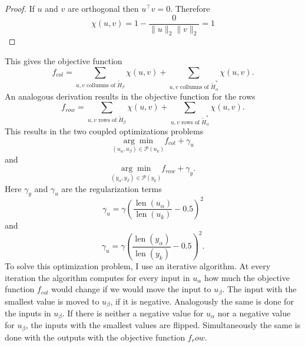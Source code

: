 \documentclass[doctype=mastersthesis,BCOR=15mm,biblatex]{ldvbook}%
\DeclareMathOperator{\length}{len}
\newcommand{\partition}{\mathcal{P}}
\begin{document}
\begin{proof}
	If $u$ and $v$ are orthogonal then $u^\top v =0$. Therefore
	\begin{equation}
	\chi(u,v) = 1-\frac{0}{\|u\|_2\|v\|_2}= 1
	\end{equation}
\end{proof}
This gives the objective function
\begin{equation}
	f_{col} = \sum_{u,v \text{ collumns of }  \tilde{H}_\beta}\!\!\!\!\!\!\chi(u,v)
	+\sum_{u,v \text{ collumns of } \tilde{H}_\alpha^*}\!\!\!\!\!\!\chi(u,v)
	.
\end{equation}
An analogous derivation results in the objective function for the rows
\begin{equation}
	f_{row} = \sum_{u,v \text{ rows of }  \tilde{H}_\beta}\!\!\!\chi(u,v)
	+\sum_{u,v \text{ rows of }  \tilde{H}_\alpha^*}\!\!\!\chi(u,v)
.
\end{equation}
This results in the two coupled optimizations problems
\begin{equation}
	\underset{(u_\alpha, u_\beta) \in \partition(u_k)}{\arg\min} f_{col} + \gamma_u
\end{equation}
and 
\begin{equation}
	\underset{(y_\alpha, y_\beta) \in \partition(y_k)}{\arg\min} f_{row} + \gamma_y
	.
\end{equation}
Here $\gamma_y$ and $\gamma_u$ are the regularization terms
\begin{equation}
\gamma_u =\gamma
\left(\frac{\length(u_\alpha)}{\length(u_k)}-0.5\right)^2
\end{equation}
and
\begin{equation}
\gamma_u =\gamma 
\left(\frac{\length(y_\alpha)}{\length(y_k)}-0.5\right)^2
.
\end{equation}
To solve this optimization problem, I use an iterative algorithm.
At every iteration the algorithm computes for every input in $u_\alpha$ how much the objective function $f_{col}$ would change if we would move the input to $u_\beta$.
The input with the smallest value is moved to $u_\beta$, if it is negative.
Analogously the same is done for the inputs in $u_\beta$.
If there is neither a negative value for  $u_\alpha$ nor a negative value for $u_\beta$, the inputs with the smallest values are flipped.
Simultaneously the same is done with the outputs with the objective function $f_row$.
\end{document}
